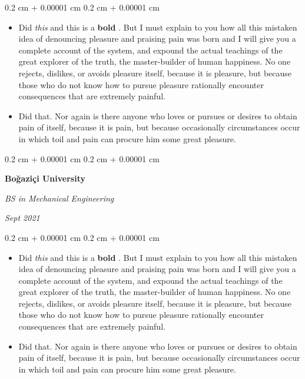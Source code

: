 \documentclass[10pt, letterpaper]{article}
\newenvironment{highlights}{
    \begin{itemize}[
        topsep=0.10 cm,
        parsep=0.10 cm,
        partopsep=0pt,
        itemsep=0pt,
        leftmargin=0.4 cm + 10pt
    ]
}{
    \end{itemize}
} %
\newenvironment{onecolentry}{
    \begin{adjustwidth}{
        0.2 cm + 0.00001 cm
    }{
        0.2 cm + 0.00001 cm
    }
}{
    \end{adjustwidth}
} %
\newenvironment{twocolentry}[2][]{
    \onecolentry
    \def\secondColumn{#2}
    \setcolumnwidth{\fill, 4.5 cm}
    \begin{paracol}{2}
}{
    \switchcolumn \raggedleft \secondColumn
    \end{paracol}
    \endonecolentry
} %
\let\hrefWithoutArrow\href
\renewcommand{\href}[2]{\hrefWithoutArrow{#1}{\ifthenelse{\equal{#2}{}}{ }{#2 }\raisebox{.15ex}{\footnotesize \faExternalLink*}}}
\begin{document}
        \vspace{0.10 cm}
        \begin{onecolentry}
            \begin{highlights}
                \item Did \textit{this} and this is a \textbf{bold} \href{https://example.com}{link}. But I must explain to you how all this mistaken idea of denouncing pleasure and praising pain was born and I will give you a complete account of the system, and expound the actual teachings of the great explorer of the truth, the master-builder of human happiness. No one rejects, dislikes, or avoids pleasure itself, because it is pleasure, but because those who do not know how to pursue pleasure rationally encounter consequences that are extremely painful.
                \item Did that. Nor again is there anyone who loves or pursues or desires to obtain pain of itself, because it is pain, but because occasionally circumstances occur in which toil and pain can procure him some great pleasure.
            \end{highlights}
        \end{onecolentry}


        \vspace{0.2 cm}

        \begin{twocolentry}{
            
            
        \textit{Sept 2021}}
            \textbf{Boğaziçi University}

            \textit{BS in Mechanical Engineering}
        \end{twocolentry}

        \vspace{0.10 cm}
        \begin{onecolentry}
            \begin{highlights}
                \item Did \textit{this} and this is a \textbf{bold} \href{https://example.com}{link}. But I must explain to you how all this mistaken idea of denouncing pleasure and praising pain was born and I will give you a complete account of the system, and expound the actual teachings of the great explorer of the truth, the master-builder of human happiness. No one rejects, dislikes, or avoids pleasure itself, because it is pleasure, but because those who do not know how to pursue pleasure rationally encounter consequences that are extremely painful.
                \item Did that. Nor again is there anyone who loves or pursues or desires to obtain pain of itself, because it is pain, but because occasionally circumstances occur in which toil and pain can procure him some great pleasure.
            \end{highlights}
        \end{onecolentry}
\end{document}
